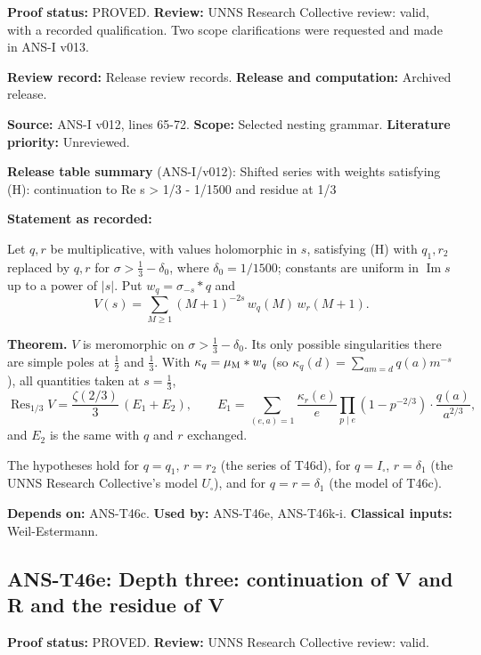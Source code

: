 \documentclass[
  11pt,
]{article}
\begin{document}
\textbf{Proof status:} PROVED. \textbf{Review:} UNNS Research Collective
review: valid, with a recorded qualification. Two scope clarifications
were requested and made in ANS-I v013.

\textbf{Review record:} Release review records. \textbf{Release and
computation:} Archived release.

\textbf{Source:} ANS-I v012, lines 65-72. \textbf{Scope:} Selected
nesting grammar. \textbf{Literature priority:} Unreviewed.

\textbf{Release table summary} (ANS-I/v012): Shifted series with weights
satisfying (H): continuation to Re s \textgreater{} 1/3 - 1/1500 and
residue at 1/3

\textbf{Statement as recorded:}

Let \(q,r\) be multiplicative, with values holomorphic in \(s\),
satisfying (H) with \(q_1,r_2\) replaced by \(q,r\) for
\(\sigma>\frac13-\delta_0\), where \(\delta_0=1/1500\); constants are
uniform in \(\operatorname{Im}s\) up to a power of \(|s|\). Put
\(w_q=\sigma_{-s}*q\) and
\[V(s)=\sum_{M\ge1}(M+1)^{-2s}\,w_q(M)\,w_r(M+1).\]

\textbf{Theorem.} \(V\) is meromorphic on \(\sigma>\frac13-\delta_0\).
Its only possible singularities there are simple poles at \(\frac12\)
and \(\frac13\). With \(\kappa_q=\mu_{\rm M}*w_q\) (so
\(\kappa_q(d)=\sum_{am=d}q(a)m^{-s}\)), all quantities taken at
\(s=\frac13\),
\[\operatorname{Res}_{1/3}V=\frac{\zeta(2/3)}3\,(E_1+E_2),\qquad E_1=\sum_{(e,a)=1}\frac{\kappa_r(e)}{e}\prod_{p\mid e}(1-p^{-2/3})\cdot\frac{q(a)}{a^{2/3}},\]
and \(E_2\) is the same with \(q\) and \(r\) exchanged.

The hypotheses hold for \(q=q_1\), \(r=r_2\) (the series of T46d), for
\(q=I_\square\), \(r=\delta_1\) (the UNNS Research Collective's model
\(U_\square\)), and for \(q=r=\delta_1\) (the model of T46c).

\textbf{Depends on:} ANS-T46c. \textbf{Used by:} ANS-T46e, ANS-T46k-i.
\textbf{Classical inputs:} Weil-Estermann.

\hypertarget{ans-t46e-depth-three-continuation-of-v-and-r-and-the-residue-of-v}{%
\subsection{ANS-T46e: Depth three: continuation of V and R and the
residue of
V}\label{ans-t46e-depth-three-continuation-of-v-and-r-and-the-residue-of-v}}

\textbf{Proof status:} PROVED. \textbf{Review:} UNNS Research Collective
review: valid.
\end{document}
